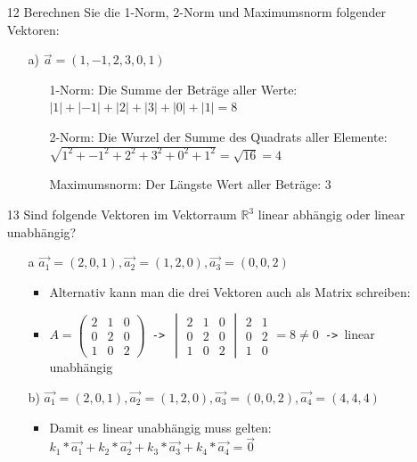 \documentclass{article}
\newcommand{\R}{\mathbb{R}}
\begin{document}
\begin{itemize}
\begin{itemize}
		\end{itemize}
		\item[12]{Berechnen Sie die 1-Norm, 2-Norm und Maximumsnorm folgender Vektoren:}
		\begin{itemize}
			\item[a)]{$\vec{a}=(1,-1,2,3,0,1)$}
			\begin{itemize}
				\item[1-Norm:]{Die Summe der Beträge aller Werte: $|1|+|-1|+|2|+|3|+|0|+|1|=8$}
				\item[2-Norm:]{Die Wurzel der Summe des Quadrats aller Elemente: $\sqrt{1^2+-1^2+2^2+3^2+0^2+1^2}=\sqrt{16}=4$}
				\item[Maximumsnorm:]{Der Längste Wert aller Beträge: $3$}
			\end{itemize}
		\end{itemize}
		\item[13]{Sind folgende Vektoren im Vektorraum ${\R}^3$ linear abhängig oder linear unabhängig?}
		\begin{itemize}
			\item[a]{$\vec{a_1}=(2,0,1), \vec{a_2}=(1,2,0), \vec{a_3}=(0,0,2)$}
			\begin{itemize}
				\item{Alternativ kann man die drei Vektoren auch als Matrix schreiben:}
				\item{$A=\begin{pmatrix} 2 & 1 & 0 \\ 0 & 2 & 0 \\ 1 & 0 & 2 \end{pmatrix}$\texttt{ -> }$\begin{vmatrix} 2 & 1 & 0 \\ 0 & 2 & 0 \\ 1 & 0 & 2 \end{vmatrix}\begin{matrix} 2 & 1 \\ 0 & 2 \\ 1 & 0 \end{matrix}=8\ne 0$\texttt{ -> }linear unabhängig}
			\end{itemize}
			\item[b)]{$\vec{a_1}=(2,0,1), \vec{a_2}=(1,2,0), \vec{a_3}=(0,0,2), \vec{a_4}=(4,4,4)$}
			\begin{itemize}
				\item{Damit es linear unabhängig muss gelten: $k_1*\vec{a_1}+k_2*\vec{a_2}+k_3*\vec{a_3}+k_4*\vec{a_4}=\vec{0}$}

\end{itemize}
\end{itemize}
\end{itemize}
\end{document}
